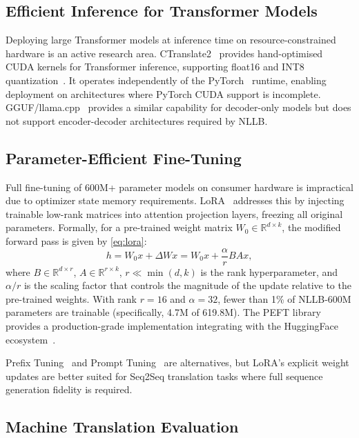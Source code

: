 \documentclass[conference]{IEEEtran}
\begin{document}
\subsection{Efficient Inference for Transformer Models}

Deploying large Transformer models at inference time on resource-constrained hardware
is an active research area.
CTranslate2~\cite{ctranslate2_klein} provides hand-optimised CUDA kernels for
Transformer inference, supporting float16 and INT8 quantization~\cite{dettmers2022llmint8}.
It operates independently of the PyTorch~\cite{pytorch2024} runtime, enabling deployment
on architectures where PyTorch CUDA support is incomplete.
GGUF/llama.cpp~\cite{llamacpp} provides a similar capability for decoder-only models
but does not support encoder-decoder architectures required by NLLB.

\subsection{Parameter-Efficient Fine-Tuning}

Full fine-tuning of 600M+ parameter models on consumer hardware is impractical due to
optimizer state memory requirements.
LoRA~\cite{hu2021lora} addresses this by injecting trainable low-rank matrices
into attention projection layers, freezing all original parameters.
Formally, for a pre-trained weight matrix $W_0 \in \mathbb{R}^{d \times k}$,
the modified forward pass is given by \eqref{eq:lora}:
\begin{equation}
  h = W_0 x + \Delta W x = W_0 x + \frac{\alpha}{r} B A x,
  \label{eq:lora}
\end{equation}
where $B \in \mathbb{R}^{d \times r}$, $A \in \mathbb{R}^{r \times k}$,
$r \ll \min(d,k)$ is the rank hyperparameter, and $\alpha/r$ is the scaling factor
that controls the magnitude of the update relative to the pre-trained weights.
With rank $r=16$ and $\alpha=32$, fewer than 1\% of NLLB-600M parameters are trainable
(specifically, 4.7M of 619.8M).
The PEFT library~\cite{peft2022} provides a production-grade implementation
integrating with the HuggingFace ecosystem~\cite{wolf2020transformers}.

Prefix Tuning~\cite{li2021prefix} and Prompt Tuning~\cite{lester2021power} are
alternatives, but LoRA's explicit weight updates are better suited for
Seq2Seq translation tasks where full sequence generation fidelity is required.

\subsection{Machine Translation Evaluation}
\end{document}
